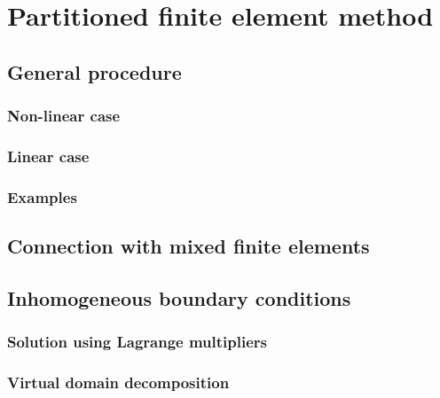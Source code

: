 \chapter{Partitioned finite element method}


\section{General procedure}

\subsection{Non-linear case}

\subsection{Linear case}

\subsection{Examples}


\section{Connection with mixed finite elements}


\section{Inhomogeneous boundary conditions}

\subsection{Solution using Lagrange multipliers}

\subsection{Virtual domain decomposition}




